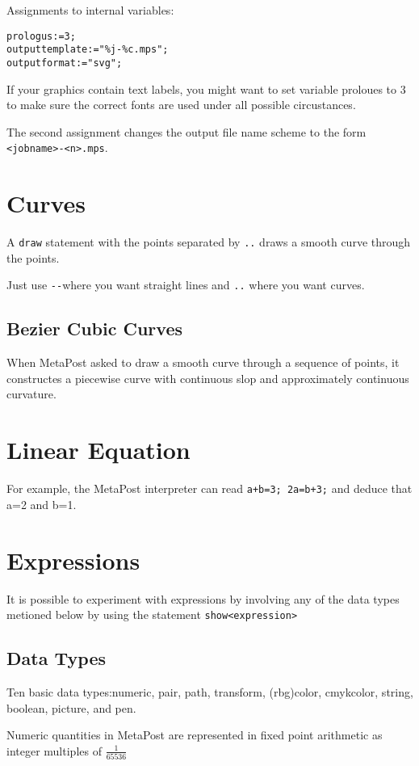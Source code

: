 \documentclass[a4paper,11pt]{article}
\begin{document}
Assignments to internal variables:
\begin{verbatim}
prologus:=3;
outputtemplate:="%j-%c.mps";
outputformat:="svg";
\end{verbatim}
If your graphics contain text labels, you might want to set variable proloues to 3 to make sure the correct fonts are used under all possible circustances.

The second assignment changes the output file name scheme to the form \verb|<jobname>-<n>.mps|.

\section{Curves}
A \verb|draw| statement with the points separated by \verb|..| draws a smooth curve through the points.

Just use \verb|--|where you want straight lines and \verb|..| where you want curves.

\subsection{Bezier Cubic Curves}
When MetaPost asked to draw a smooth curve through a sequence of points, it constructes a piecewise curve with continuous slop and approximately continuous curvature. 
\section{Linear Equation}
For example, the MetaPost interpreter can read \verb|a+b=3; 2a=b+3;| and deduce that a=2 and b=1.
\section{Expressions}
It is possible to experiment with expressions by involving any of the data types metioned below by using the statement \verb|show<expression>|

\subsection{Data Types}
Ten basic data types:numeric, pair, path, transform, (rbg)color, cmykcolor, string, boolean, picture, and pen.

Numeric quantities in MetaPost are represented in fixed point arithmetic as integer multiples of $\frac{1}{65536}$
\end{document}
